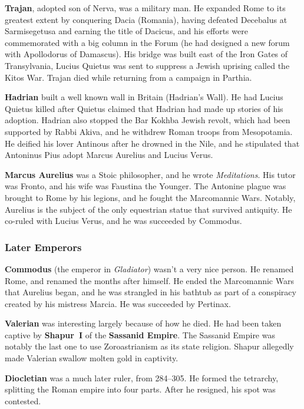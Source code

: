 \textbf{Trajan}, adopted son of Nerva, was a military man.
He expanded Rome to its greatest extent by conquering Dacia (Romania),
having defeated Decebalus at Sarmisegetusa and earning the title of Dacicus,
and his efforts were commemorated with a big column in the Forum
(he had designed a new forum with Apollodorus of Damascus).
His bridge was built east of the Iron Gates of Transylvania,
Lucius Quietus was sent to suppress a Jewish uprising called the Kitos War.
Trajan died while returning from a campaign in Parthia.

\textbf{Hadrian} built a well known wall in Britain (Hadrian's Wall).
He had Lucius Quietus killed after Quietus claimed that Hadrian had made up stories of his adoption.
Hadrian also stopped the Bar Kokhba Jewish revolt, which had been supported by Rabbi Akiva,
and he withdrew Roman troops from Mesopotamia.
He deified his lover Antinous after he drowned in the Nile,
and he stipulated that Antoninus Pius adopt Marcus Aurelius and Lucius Verus.

\textbf{Marcus Aurelius} was a Stoic philosopher, and he wrote \textit{Meditations}.
His tutor was Fronto, and his wife was Faustina the Younger.
The Antonine plague was brought to Rome by his legions,
and he fought the Marcomannic Wars.
Notably, Aurelius is the subject of the only equestrian statue that survived antiquity.
He co-ruled with Lucius Verus, and he was succeeded by Commodus.

\subsubsection*{Later Emperors}

\textbf{Commodus} (the emperor in \textit{Gladiator}) wasn't a very nice person.
He renamed Rome, and renamed the months after himself.
He ended the Marcomannic Wars that Aurelius began, and he was strangled in his bathtub
as part of a conspiracy created by his mistress Marcia.
He was succeeded by Pertinax.

\textbf{Valerian} was interesting largely because of how he died.
He had been taken captive by \textbf{Shapur~I} of the \textbf{Sassanid Empire}.
The Sassanid Empire was notably the last one to use Zoroastrianism as its state religion.
Shapur allegedly made Valerian swallow molten gold in captivity.

\textbf{Diocletian} was a much later ruler, from 284--305.
He formed the tetrarchy, splitting the Roman empire into four parts.
After he resigned, his spot was contested.

